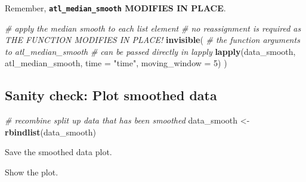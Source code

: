 \documentclass[
]{scrreprt}
\newenvironment{Shaded}{}{}
\newcommand{\CommentTok}[1]{\textcolor[rgb]{0.38,0.63,0.69}{\textit{#1}}}
\newcommand{\DataTypeTok}[1]{\textcolor[rgb]{0.56,0.13,0.00}{#1}}
\newcommand{\DecValTok}[1]{\textcolor[rgb]{0.25,0.63,0.44}{#1}}
\newcommand{\KeywordTok}[1]{\textcolor[rgb]{0.00,0.44,0.13}{\textbf{#1}}}
\newcommand{\NormalTok}[1]{#1}
\newcommand{\StringTok}[1]{\textcolor[rgb]{0.25,0.44,0.63}{#1}}
\begin{document}
Remember, \textbf{\texttt{atl\_median\_smooth} MODIFIES IN PLACE}.

\begin{Shaded}
\begin{Highlighting}[]
\CommentTok{\# apply the median smooth to each list element}
\CommentTok{\# no reassignment is required as THE FUNCTION MODIFIES IN PLACE!}
\KeywordTok{invisible}\NormalTok{(}
  \CommentTok{\# the function arguments to atl\_median\_smooth}
  \CommentTok{\# can be passed directly in lapply}
  \KeywordTok{lapply}\NormalTok{(data\_smooth, atl\_median\_smooth,}
         \DataTypeTok{time =} \StringTok{"time"}\NormalTok{, }\DataTypeTok{moving\_window =} \DecValTok{5}\NormalTok{)}
\NormalTok{)}
\end{Highlighting}
\end{Shaded}

\hypertarget{sanity-check-plot-smoothed-data}{%
\subsection{Sanity check: Plot smoothed data}\label{sanity-check-plot-smoothed-data}}

\begin{Shaded}
\begin{Highlighting}[]
\CommentTok{\# recombine split up data that has been smoothed}
\NormalTok{data\_smooth <{-}}\StringTok{ }\KeywordTok{rbindlist}\NormalTok{(data\_smooth)}
\end{Highlighting}
\end{Shaded}

Save the smoothed data plot.

Show the plot.
\end{document}
